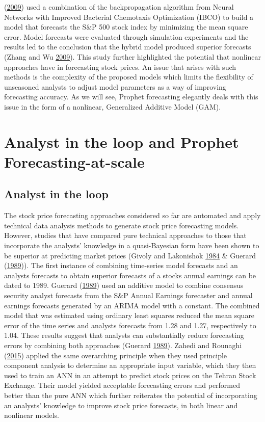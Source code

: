 \documentclass[12pt,preprint, authoryear]{elsarticle}
\numberwithin{equation}{section}
\numberwithin{figure}{section}
\numberwithin{table}{section}
\begin{document}
(\protect\hyperlink{ref-zhang2009stock}{2009}) used a combination of the
backpropagation algorithm from Neural Networks with Improved Bacterial
Chemotaxis Optimization (IBCO) to build a model that forecasts the S\&P
500 stock index by minimizing the mean square error. Model forecasts
were evaluated through simulation experiments and the results led to the
conclusion that the hybrid model produced superior forecasts (Zhang and
Wu \protect\hyperlink{ref-zhang2009stock}{2009}). This study further
highlighted the potential that nonlinear approaches have in forecasting
stock prices. An issue that arises with such methods is the complexity
of the proposed models which limits the flexibility of unseasoned
analysts to adjust model parameters as a way of improving forecasting
accuracy. As we will see, Prophet forecasting elegantly deals with this
issue in the form of a nonlinear, Generalized Additive Model (GAM).

\section{Analyst in the loop and Prophet
Forecasting-at-scale}\label{analyst-in-the-loop-and-prophet-forecasting-at-scale}

\subsection{Analyst in the loop}\label{analyst-in-the-loop}

The stock price forecasting approaches considered so far are automated
and apply technical data analysis methods to generate stock price
forecasting models. However, studies that have compared pure technical
approaches to those that incorporate the analysts' knowledge in a
quasi-Bayesian form have been shown to be superior at predicting market
prices (Givoly and Lakonishok
\protect\hyperlink{ref-givoly1984quality}{1984} \& Guerard
(\protect\hyperlink{ref-guerard1989combining}{1989})). The first
instance of combining time-series model forecasts and an analysts
forecasts to obtain superior forecasts of a stocks annual earnings can
be dated to 1989. Guerard
(\protect\hyperlink{ref-guerard1989combining}{1989}) used an additive
model to combine consensus security analyst forecasts from the S\&P
Annual Earnings forecaster and annual earnings forecasts generated by an
ARIMA model with a constant. The combined model that was estimated using
ordinary least squares reduced the mean square error of the time series
and analysts forecasts from 1.28 and 1.27, respectively to 1.04. These
results suggest that analysts can substantially reduce forecasting
errors by combining both approaches (Guerard
\protect\hyperlink{ref-guerard1989combining}{1989}). Zahedi and Rounaghi
(\protect\hyperlink{ref-zahedi2015application}{2015}) applied the same
overarching principle when they used principle component analysis to
determine an appropriate input variable, which they then used to train
an ANN in an attempt to predict stock prices on the Tehran Stock
Exchange. Their model yielded acceptable forecasting errors and
performed better than the pure ANN which further reiterates the
potential of incorporating an analysts' knowledge to improve stock price
forecasts, in both linear and nonlinear models.
\end{document}
